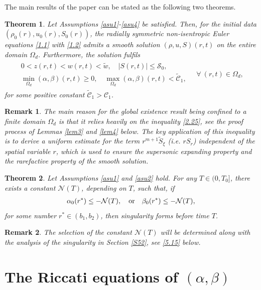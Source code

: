 \documentclass[11pt,reqno]{article}
\newtheorem{thm}{Theorem}
\newtheorem{rem}{Remark}
\newcommand{\dps}{\displaystyle}
\numberwithin{equation}{section}
\begin{document}
The main results of the paper can be stated as the following two theorems.
\begin{thm}\label{thm1}
Let Assumptions \ref{asu1}-\ref{asu4} be satisfied. Then, for the initial data $(\rho_0(r), u_0(r), S_0(r))$, the radially symmetric non-isentropic Euler equations \eqref{1.1} with \eqref{1.2} admits a smooth solution $(\rho, u, S)(r,t)$ on the entire domain $\Omega_d$. Furthermore, the solution fulfils
\begin{align}\label{2.27}
\begin{array}{c}
0<z(r,t)<w(r,t)<\tilde{w}, \quad |S(r,t)|\leq \mathcal{S}_0,\\
\dps \min_{\Omega_d}(\alpha,\beta)(r,t)\geq0, \quad \max_{\Omega_d}(\alpha,\beta)(r,t)< \widetilde{\mathcal{C}}_1,
\end{array}
\quad \forall\ (r,t)\in\Omega_d,
\end{align}
for some positive constant $\widetilde{\mathcal{C}}_1> \mathcal{C}_1$.
\end{thm}
\begin{rem}\label{r-b}
The main reason for the global existence result being confined to a finite domain $\Omega_d$ is that it relies heavily on the inequality \eqref{2.25}, see the proof process of Lemmas \ref{lem3} and \ref{lem4} below. The key application of this inequality is to derive a uniform estimate for the term $r^{m+1}\widetilde{S}_\xi$ (i.e. $rS_r$) independent of the spatial variable $r$, which is used to ensure the supersonic expanding property and the rarefactive property of the smooth solution.
\end{rem}

\begin{thm}\label{thm2}
Let Assumptions \ref{asu1} and \ref{asu2} hold. For any $T\in(0, T_0]$, there exists a constant $\mathcal{N}(T)$, depending on $T$, such that,  if
\begin{align}
\alpha_0(r^*)\leq -\mathcal{N}(T),\quad {\rm or}\quad  \beta_0(r^*)\leq -\mathcal{N}(T), \notag
\end{align}
for some number $r^*\in(b_1,b_2)$, then singularity forms before time $T$.
\end{thm}
\begin{rem}\label{r4}
The selection of the constant $\mathcal{N}(T)$ will be determined along with the analysis of the singularity in Section \ref{S52}, see \eqref{5.15} below.
\end{rem}




\section{The Riccati equations of $(\alpha,\beta)$}\label{S3}
\end{document}
